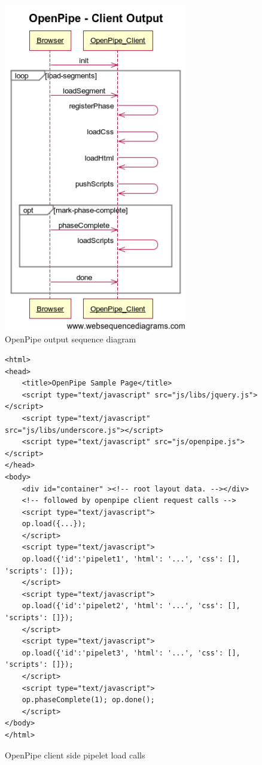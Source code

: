 \documentclass[12pt]{report}
\begin{document}
\begin{figure}[H]
\label{fig:openPipeClientOutputSequenceDiagram}
\centering
\includegraphics[width=80mm]{figures/images/openpipe_clientoutput.png}
\caption{OpenPipe output sequence diagram}
\end{figure}

\begin{figure}[H]
\label{fig:openPipeClientPipeletLoadCalls}
\begin{lstlisting}
<html>
<head>
	<title>OpenPipe Sample Page</title>
	<script type="text/javascript" src="js/libs/jquery.js"></script>
	<script type="text/javascript" src="js/libs/underscore.js"></script>
	<script type="text/javascript" src="js/openpipe.js"></script>
</head>
<body>
	<div id="container" ><!-- root layout data. --></div>
	<!-- followed by openpipe client request calls -->
	<script type="text/javascript">
	op.load({...});
	</script>
	<script type="text/javascript">
	op.load({'id':'pipelet1', 'html': '...', 'css': [], 'scripts': []});
	</script>
	<script type="text/javascript">
	op.load({'id':'pipelet2', 'html': '...', 'css': [], 'scripts': []});
	</script>
	<script type="text/javascript">
	op.load({'id':'pipelet3', 'html': '...', 'css': [], 'scripts': []});
	</script>
	<script type="text/javascript">
	op.phaseComplete(1); op.done();
	</script>
</body>
</html>
\end{lstlisting}
\caption{OpenPipe client side pipelet load calls}
\end{figure}
\end{document}
